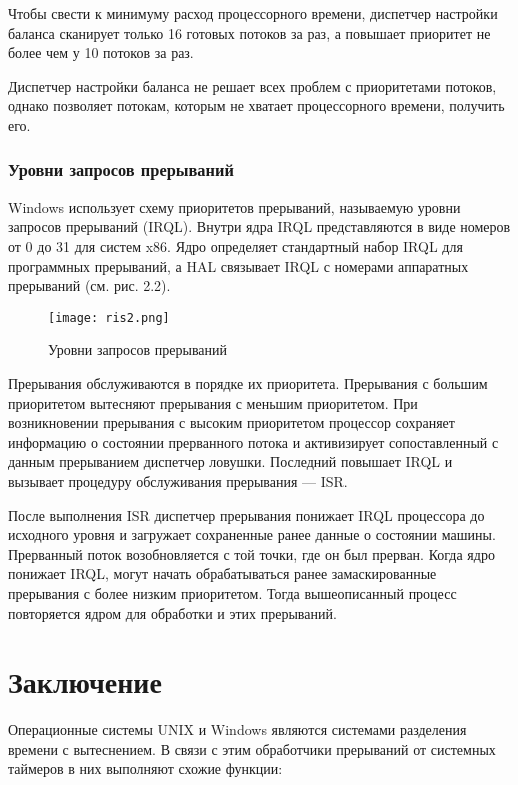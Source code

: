 \documentclass[12pt]{report}
\begin{document}
Чтобы свести к минимуму расход процессорного времени, диспетчер настройки баланса сканирует только 16 готовых потоков за раз, а повышает приоритет не более чем у 10 потоков за раз.

Диспетчер настройки баланса не решает всех проблем с
приоритетами потоков, однако позволяет потокам, которым не хватает процессорного времени, получить его.

\subsection{Уровни запросов прерываний}
Windows использует схему приоритетов прерываний, называемую уровни запросов прерываний (IRQL). Внутри ядра IRQL представляются в виде номеров от 0 до 31 для систем x86. Ядро определяет стандартный набор IRQL для программных прерываний, а HAL связывает IRQL с номерами аппаратных прерываний (см. рис. 2.2).

\begin{figure}[h]
	\centering
	{\texttt{[image: ris2.png]}} 
	\caption{Уровни запросов прерываний}
	\label{ris2}
\end{figure}

Прерывания обслуживаются в порядке их приоритета. Прерывания с большим приоритетом вытесняют прерывания с меньшим приоритетом.
При возникновении прерывания с высоким приоритетом процессор сохраняет информацию о состоянии прерванного потока и активизирует сопоставленный с данным прерыванием диспетчер ловушки. Последний повышает IRQL и вызывает процедуру обслуживания прерывания — ISR.

После выполнения ISR диспетчер прерывания понижает IRQL процессора до исходного уровня и загружает сохраненные ранее данные о состоянии машины. Прерванный поток возобновляется с той точки, где он был прерван. Когда ядро понижает IRQL, могут начать обрабатываться ранее замаскированные прерывания с более низким приоритетом. Тогда вышеописанный процесс повторяется ядром для обработки и этих прерываний.

\chapter{Заключение}
Операционные системы UNIX и Windows являются системами разделения времени с вытеснением. В связи с этим обработчики прерываний от системных таймеров в них выполняют схожие
функции:
\end{document}
